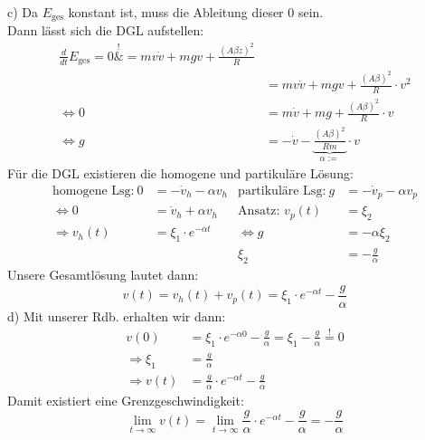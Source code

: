 \documentclass[11pt a4paper]{article}
\begin{document}
c) Da $E_\text{ges}$ konstant ist, muss die Ableitung dieser $0$ sein.\\
Dann lässt sich die DGL aufstellen:
\begin{align*}
	\frac{d}{dt} E_\text{ges} 
	= 0
	\overset{!}&{=}
	m v \dot v + mgv
	+ \frac{(A\beta \dot z)^2} R \\
	&= m v \dot v + mgv + \frac{(A\beta)^2} R \cdot v^2 \\
	\Leftrightarrow
	0
	&= m \dot v + mg + \frac{(A\beta)^2} R \cdot v \\
	\Leftrightarrow
	g
	&= - \dot v - \underbrace{\frac{(A\beta)^2}{Rm}}_{\alpha :=}
	\cdot v
\end{align*}
Für die DGL existieren die homogene und partikuläre Lösung:
\begin{align*}
	\text{homogene Lsg:} \ 
	0
	&= - \dot v_h - \alpha v_h
	&
	\text{partikuläre Lsg:} \ 
	g
	&= - \dot v_p - \alpha v_p \\
	\Leftrightarrow
	0
	&= \dot v_h + \alpha v_h
	&
	\text{Ansatz: } v_p(t) 
	&= \xi_2 \\
	\Rightarrow
	v_h(t) 
	&= \xi_1 \cdot e^{-\alpha t}
	&
	\Leftrightarrow
	g
	&=- \alpha \xi_2 \\
	&&
	\xi_2
	&= -\frac g\alpha
\end{align*}
Unsere Gesamtlösung lautet dann:
\[
	v(t) = v_h(t) + v_p(t) = \xi_1 \cdot e^{-\alpha t} -\frac g\alpha
\]
d) Mit unserer Rdb. erhalten wir dann:
\begin{align*}
	v(0) 
	&= \xi_1 \cdot e^{-\alpha 0} -\frac g\alpha 
	= \xi_1 - \frac g\alpha \overset != 0 \\
	\Rightarrow
	\xi_1 
	&= \frac g\alpha \\
	\Rightarrow
	v(t) 
	&= \frac g\alpha \cdot e^{-\alpha t} -\frac g\alpha
\end{align*}
Damit existiert eine Grenzgeschwindigkeit:
\[
	\lim_{t \rightarrow \infty} v(t)
	=
	\lim_{t \rightarrow \infty}
	\frac g\alpha \cdot e^{-\alpha t} -\frac g\alpha
	=
	-\frac g\alpha
\]
\end{document}

